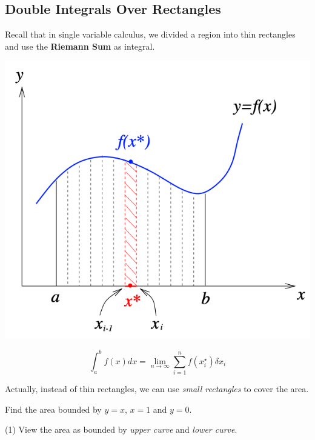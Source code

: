 
\begin{spacing}{1.3}

    \section{Double Integrals Over Rectangles}

    Recall that in single variable calculus, we divided a region into 
    thin rectangles and use the {\bf Riemann Sum} as integral.
    \begin{center}
        \includegraphics[scale=0.45]{images/Ch14-intro.png}
    \end{center}
    $$\int_a^b f(x)dx=\lim_{n\rightarrow \infty}\sum_{i=1}^n f(x_i^\star)\delta x_i$$
    
    Actually, instead of thin rectangles, we can use {\it small rectangles} to cover the area.

    \eg Find the area bounded by $y=x$, $x=1$ and $y=0$.

    \sol (1) View the area as bounded by {\it upper curve} and {\it lower curve}.
    

    \begin{center}
        \begin{tikzpicture}[x=0.75pt,y=0.75pt,yscale=-1,xscale=1]
        

\end{tikzpicture}
\end{center}
\end{spacing}
